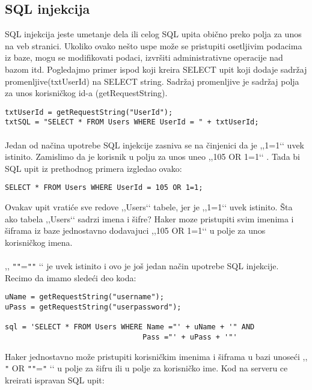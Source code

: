 \documentclass[a4paper]{article}
\begin{document}
\subsection{SQL injekcija}
\label{subsec:sql}

SQL injekcija jeste umetanje dela ili celog SQL upita obično preko polja za unos na veb stranici. Ukoliko ovako nešto uspe može se pristupiti osetljivim podacima iz baze, mogu se modifikovati podaci, izvršiti administrativne operacije nad bazom itd. Pogledajmo primer ispod koji kreira SELECT upit koji dodaje sadržaj promenljive(txtUserId) na SELECT string. Sadržaj promenljive je sadržaj polja za unos korisničkog id-a (getRequestString).
\begin{verbatim}
txtUserId = getRequestString("UserId");
txtSQL = "SELECT * FROM Users WHERE UserId = " + txtUserId;
\end{verbatim}

\paragraph{}
Jedan od načina upotrebe SQL injekcije zasniva se na činjenici da je ,,1=1‘‘ uvek istinito. Zamislimo da je korisnik u polju za unos uneo ,,105 OR 1=1‘‘ . Tada bi SQL upit iz prethodnog primera izgledao ovako:

\begin{verbatim}
SELECT * FROM Users WHERE UserId = 105 OR 1=1;
\end{verbatim}


\noindent Ovakav upit vratiće sve redove ,,Users‘‘ tabele, jer je ,,1=1‘‘ uvek istinito. Šta ako tabela ,,Users‘‘ sadrzi imena i šifre? Haker moze pristupiti svim imenima i šiframa iz baze jednostavno dodavajuci ,,105 OR 1=1‘‘ u polje za unos korisničkog imena.

\paragraph{}
 ,, \texttt{"}\texttt{"}=\texttt{"}\texttt{"} ‘‘ je uvek istinito i ovo je još jedan način upotrebe SQL injekcije. Recimo da imamo sledeći deo koda:
\begin{verbatim}
uName = getRequestString("username");
uPass = getRequestString("userpassword");

sql = 'SELECT * FROM Users WHERE Name ="' + uName + '" AND 
								Pass ="' + uPass + '"'
\end{verbatim}

\noindent Haker jednostavno može pristupiti korisničkim imenima i šiframa u bazi unoseći ,, \texttt{"} OR \texttt{"}\texttt{"}=\texttt{"} ‘‘ u polje za šifru ili u polje za korisničko ime. Kod na serveru ce kreirati ispravan SQL upit:
\end{document}
